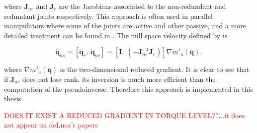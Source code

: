 where $\mathbf{J}_{nr}$ and $\mathbf{J}_{r}$ are the Jacobians associated to the non-redundant and redundant joints respectively. This approach is often used in parallel manipulators where some of the joints are active and other passive, and a more detailed treatment can be found in \cite{Murray:1994:MIR:561828}. The null space velocity defined by \cite{reduced_gradient} is

\begin{equation}
\mathbf{\dot{q}}_{ns} = \left[\mathbf{\dot{q}}_{r}, \  \mathbf{\dot{q}}_{nr} \right ] 
= \left[\mathbf{I}, \ (-\mathbf{J}_{nr}^{-1} \mathbf{J}_r)  \right ]  \nabla m'_u(\mathbf{q}),
\label{eq:ns_velocity_RG}
\end{equation}




where $\nabla m'_u(\mathbf{q})$ is the  two-dimensional reduced gradient.  It is clear to see that if $\mathbf{J}_{nr}$ does not lose rank, its inversion is much more efficient than the computation of the pseudoinverse. Therefore this approach is implemented in this thesis.

\textcolor{red}{DOES IT EXIST A REDUCED GRADIENT IN TORQUE LEVEL??...it does not appear on deLuca's papers}






%











